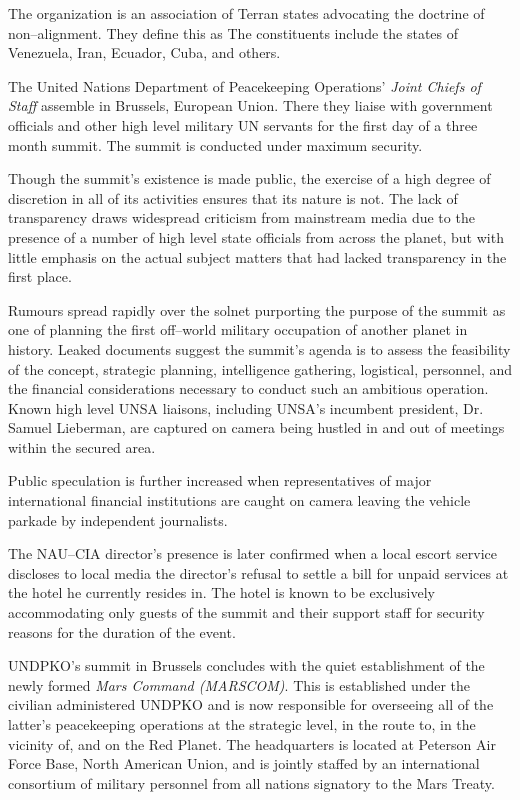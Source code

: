 The organization is an association of Terran states advocating the doctrine of non--alignment. They define this as  The constituents include the states of Venezuela, Iran, Ecuador, Cuba, and others.
\StopTimelineDate

The United Nations Department of Peacekeeping Operations' {\it Joint Chiefs of Staff} assemble in Brussels, European Union. There they liaise with government officials and other high level military UN servants for the first day of a three month summit. The summit is conducted under maximum security. 

Though the summit's existence is made public, the exercise of a high degree of discretion in all of its activities ensures that its nature is not. The lack of transparency draws widespread criticism from mainstream media due to the presence of a number of high level state officials from across the planet, but with little emphasis on the actual subject matters that had lacked transparency in the first place.

Rumours spread rapidly over the solnet purporting the purpose of the summit as one of planning the first off--world military occupation of another planet in history. Leaked documents suggest the summit's agenda is to assess the feasibility of the concept, strategic planning, intelligence gathering, logistical, personnel, and the financial considerations necessary to conduct such an ambitious operation. Known high level UNSA liaisons, including UNSA's incumbent president, Dr. Samuel Lieberman, are captured on camera being hustled in and out of meetings within the secured area.

Public speculation is further increased when representatives of major international financial institutions are caught on camera leaving the vehicle parkade by independent journalists. 

The NAU--CIA director's presence is later confirmed when a local escort service discloses to local media the director's refusal to settle a bill for unpaid services at the hotel he currently resides in. The hotel is known to be exclusively accommodating only guests of the summit and their support staff for security reasons for the duration of the event.
\StopTimelineDate

UNDPKO's summit in Brussels concludes with the quiet establishment of the newly formed {\it Mars Command (MARSCOM)}. This is established under the civilian administered UNDPKO and is now responsible for overseeing all of the latter's peacekeeping operations at the strategic level, in the route to, in the vicinity of, and on the Red Planet. The headquarters is located at Peterson Air Force Base, North American Union, and is jointly staffed by an international consortium of military personnel from all nations signatory to the Mars Treaty.

